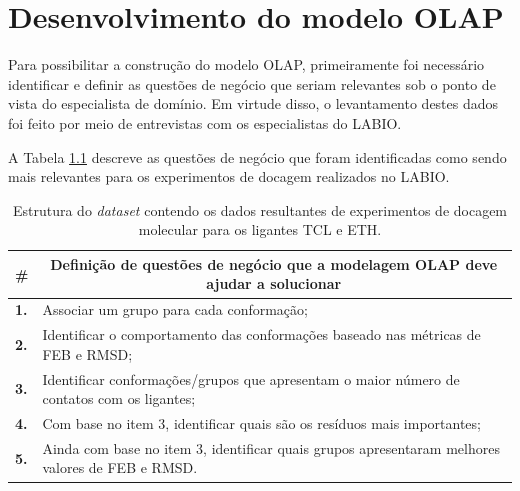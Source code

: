 \chapter{Desenvolvimento do modelo OLAP}

Para possibilitar a construção do modelo OLAP, primeiramente foi necessário identificar e definir as questões de negócio que seriam relevantes sob o ponto de vista do especialista de domínio. Em virtude disso, o levantamento destes dados foi feito por meio de entrevistas com os especialistas do LABIO.

A Tabela \ref{tab:questaoNegocio} descreve as questões de negócio que foram identificadas como sendo mais relevantes para os experimentos de docagem realizados no LABIO. 

\begin{table}[h]
\caption{Estrutura do \emph{dataset} contendo os dados resultantes de experimentos de docagem molecular para os ligantes TCL e ETH.}
\label{tab:questaoNegocio}
\centering
\begin{tabular}{@{}ll@{}}
\toprule
\textbf{\#} & \multicolumn{1}{c}{\textbf{Definição de questões de negócio que a modelagem OLAP deve ajudar a solucionar}} \\ \midrule
\textbf{1.} & Associar um grupo para cada conformação;                                                                    \\
\textbf{2.} & Identificar o comportamento das conformações baseado nas métricas de FEB e RMSD;                            \\
\textbf{3.} & Identificar conformações/grupos que apresentam o maior número de contatos com os ligantes;                  \\
\textbf{4.} & Com base no item 3, identificar quais são os resíduos mais importantes;                                     \\
\textbf{5.} & Ainda com base no item 3, identificar quais grupos apresentaram melhores valores de FEB e RMSD.             \\ \bottomrule
\end{tabular}
\end{table}

